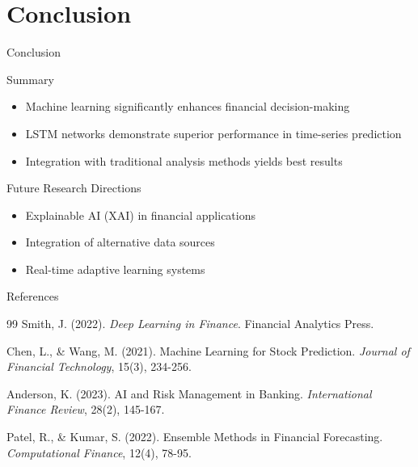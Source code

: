 \documentclass[aspectratio=169]{beamer}
\begin{document}
\section{Conclusion}

\begin{frame}{Conclusion}
  \begin{block}{Summary}
    \begin{itemize}
      \item Machine learning significantly enhances financial decision-making
      \item LSTM networks demonstrate superior performance in time-series prediction
      \item Integration with traditional analysis methods yields best results
    \end{itemize}
  \end{block}
  
  \vspace{0.5cm}
  
  \begin{block}{Future Research Directions}
    \begin{itemize}
      \item Explainable AI (XAI) in financial applications
      \item Integration of alternative data sources
      \item Real-time adaptive learning systems
    \end{itemize}
  \end{block}
\end{frame}

\begin{frame}{References}
  \begin{thebibliography}{99}
     Smith, J. (2022). \textit{Deep Learning in Finance}. Financial Analytics Press.
    
     Chen, L., \& Wang, M. (2021). Machine Learning for Stock Prediction. \textit{Journal of Financial Technology}, 15(3), 234-256.
    
     Anderson, K. (2023). AI and Risk Management in Banking. \textit{International Finance Review}, 28(2), 145-167.
    
     Patel, R., \& Kumar, S. (2022). Ensemble Methods in Financial Forecasting. \textit{Computational Finance}, 12(4), 78-95.
  \end{thebibliography}
\end{frame}
\end{document}

